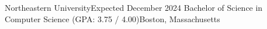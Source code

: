     \resumeSubHeadingListStart
    
    \vspace{-2pt}

    \resumeSubheading
    {Northeastern University}{Expected December 2024}
    {Bachelor of Science in Computer Science (GPA: 3.75 / 4.00)}{Boston, Massachusetts}
    \resumeSubHeadingListEnd
